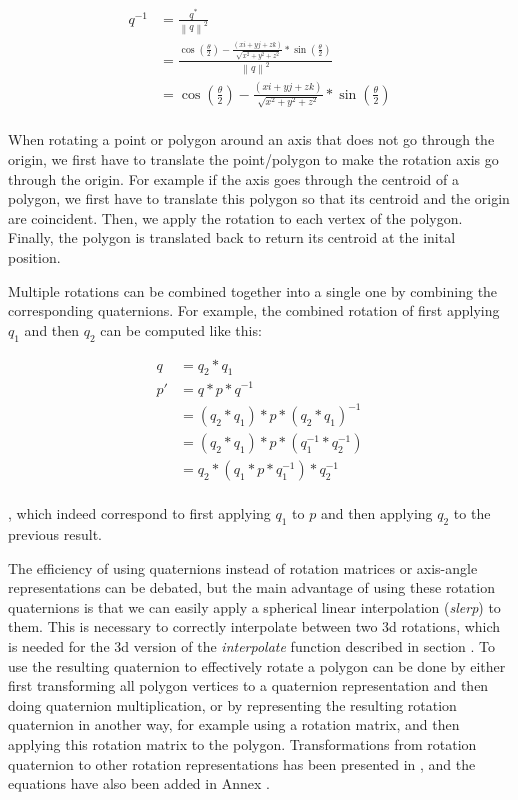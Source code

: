 		\begin{equation}
		\begin{split}
			q^{-1} & = \frac{q^{\ast}}{{\left \| q \right \|}^2} \\
					& = \frac{\cos(\frac{\theta}{2}) - \frac{(xi + yj + zk)}{\sqrt{x^2 + y^2 + z^2}}*\sin(\frac{\theta}{2})}{{\left \| q \right \|}^2} \\
					& = \cos(\frac{\theta}{2}) - \frac{(xi + yj + zk)}{\sqrt{x^2 + y^2 + z^2}}*\sin(\frac{\theta}{2}) \\
		\end{split}
		\end{equation}
		
		When rotating a point or polygon around an axis that does not go through the origin, we first have to translate the point/polygon to make the rotation axis go through the origin. For example if the axis goes through the centroid of a polygon, we first have to translate this polygon so that its centroid and the origin are coincident. Then, we apply the rotation to each vertex of the polygon. Finally, the polygon is translated back to return its centroid at the inital position.
		
		Multiple rotations can be combined together into a single one by combining the corresponding quaternions. For example, the combined rotation of first applying \( q_1 \) and then \( q_2 \) can be computed like this:
		
		\begin{equation}
		\begin{split}
			q 	& = q_2*q_1 \\
			p' 	& = q*p*q^{-1} \\
				& = (q_2*q_1)*p*(q_2*q_1)^{-1} \\
				& =  (q_2*q_1)*p*(q_1^{-1}*q_2^{-1}) \\
				& = q_2*(q_1*p*q_1^{-1})*q_2^{-1} \\
		\end{split}
		\end{equation}
		
		, which indeed correspond to first applying \( q_1 \) to \( p \) and then applying \( q_2 \) to the previous result.
		
		The efficiency of using quaternions instead of rotation matrices or axis-angle representations can be debated, but the main advantage of using these rotation quaternions is that we can easily apply a spherical linear interpolation (\textit{slerp}) to them. This is necessary to correctly interpolate between two 3d rotations, which is needed for the 3d version of the \textit{interpolate} function described in section . To use the resulting quaternion to effectively rotate a polygon can be done by either first transforming all polygon vertices to a quaternion representation and then doing quaternion multiplication, or by representing the resulting rotation quaternion in another way, for example using a rotation matrix, and then applying this rotation matrix to the polygon. Transformations from rotation quaternion to other rotation representations has been presented in \cite{ISO19141}, and the equations have also been added in Annex .
			
